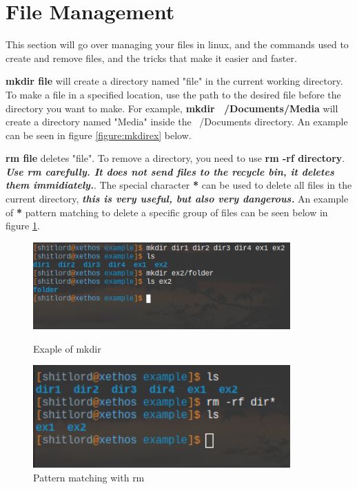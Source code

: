 \documentclass[12pt, letterpaper, twoside]{article}
\begin{document}
\newpage
\section{File Management}

This section will go over managing your files in linux, and the commands used to create and remove files, and the tricks that make it easier and faster.

\textbf{mkdir file} will create a directory named "file" in the current working directory. To make a file in a specified location, use the path to the desired file before the directory you want to make. For example, \textbf{mkdir ~/Documents/Media} will create a directory named "Media" inside the ~/Documents directory. An example can be seen in figure \ref{figure:mkdirex} below.

\textbf{rm file} deletes "file". To remove a directory, you need to use \textbf{rm -rf directory}. \textbf{\textit{Use rm carefully. It does not send files to the recycle bin, it deletes them immidiately.}}. The special character \textbf{*} can be used to delete all files in the current directory, \textbf{\textit{this is very useful, but also very dangerous.}} An example of \textbf{*} pattern matching to delete a specific group of files can be seen below in figure \ref{figure:rmpatex}. 

\begin{figure} [!htb]
  \includegraphics[width=0.88\textwidth]{mkdirex}
  \caption{Exaple of mkdir}\label{figure:mkdirex}
\endminipage\hfill
{}
\includegraphics[width=0.88\textwidth]{rmpatex}
  \caption{Pattern matching with rm}\label{figure:rmpatex}
\endminipage
\end{figure}
\end{document}
